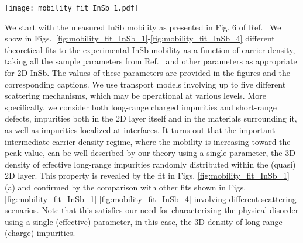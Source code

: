 \documentclass[aps,prmaterials,twocolumn,superscriptaddress,longbibliography]{revtex4-2}
\begin{document}
\begin{figure*}[!htb]
    \centering
    \texttt{[image: mobility\_fit\_InSb\_1.pdf]}
    \caption{Experimental mobility of an InSb quantum well from the group of Bakkers \cite{gazibegovic2019bottomup} (solid line) plotted as a function of carrier density and theoretical fits using the Boltzmann transport theory. (a) The best fit to the increasing part of the mobility assuming only charge impurities randomly distributed in the InSb quantum well (dashed line, referred to as 3D long-range impurity). (b) The best fit to the flat part assuming short-range scattering by impurities randomly distributed either in the 2D layer itself (dotted line, referred to as 2D short-range impurity) or throughout the whole sample (dashed line, referred to as 3D short-range impurity). Note that the 2D short-range impurity model yields a much better fit than the 3D short-range impurity model. (c) The best fit over the entire range of mobility data using two fitting parameters (one for long-range scattering and the other for short-range scattering).
    Here $V_\mathrm{short}$ is the short-range impurity disorder potential and $n_\mathrm{long(short)}$ is the long-range (short-range) impurity density. We use the background dielectric constant $\kappa_\mathrm{InSb}=18$, the InSb quantum well width $a=80$nm, and the effective mass $m=0.013m_e$ where $m_e$ is the bare electron mass. The experimental data are smoothed for visual clarity. The actual fit is performed to the noisy original data.  }
    \label{fig:mobility_fit_InSb_1}
  \end{figure*}
  
 We start with the measured InSb mobility as presented in Fig. 6 of Ref.~  We show in Figs.~\ref{fig:mobility_fit_InSb_1}-\ref{fig:mobility_fit_InSb_4} different theoretical fits to the experimental InSb mobility as a function of carrier density, taking all the sample parameters from Ref.~  and other parameters as appropriate for 2D InSb. The values of these parameters are provided in the figures and the corresponding captions. We use transport models involving up to five different scattering mechanisms, which may be operational at various levels. More specifically, we consider both long-range charged impurities and short-range defects,  impurities both in the 2D layer itself and in the materials surrounding it, as well as impurities localized at interfaces.
It turns out that the important intermediate carrier density regime,  where the mobility is increasing toward the peak value, can be well-described by our theory using a single parameter, the 3D density of effective long-range impurities randomly distributed within the (quasi) 2D layer. This property is revealed by the fit in Figs. \ref{fig:mobility_fit_InSb_1}(a) and confirmed by the comparison with other fits shown in  Figs. \ref{fig:mobility_fit_InSb_1}-\ref{fig:mobility_fit_InSb_4} involving different scattering scenarios.  Note that this satisfies our need for characterizing the physical disorder using a single (effective) parameter,  in this case, the 3D density of long-range (charge) impurities.
  
\end{document}
